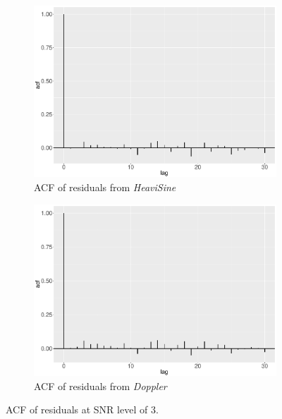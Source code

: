 \begin{figure}[!ht]
\begin{subfigure}{0.45\textwidth}
    \includegraphics[width=\textwidth]{Chapters/02TractorSplineTheory/plot/ggplot/ggacfHeavi3.pdf}
    \caption{ACF of residuals from \textit{HeaviSine}}
    \end{subfigure}
    \begin{subfigure}{0.45\textwidth}
    \centering
    \includegraphics[width=\textwidth]{Chapters/02TractorSplineTheory/plot/ggplot/ggacfDoppler3.pdf}
    \caption{ACF of residuals from \textit{Doppler}}
    \end{subfigure}
\caption{ACF of residuals at SNR level of 3.}\label{tractorsplineSNR3acf}
 \end{figure}

